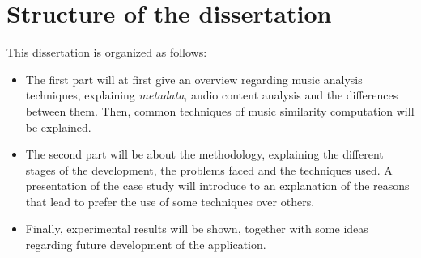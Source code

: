 \section{Structure of the dissertation}
This dissertation is organized as follows:
\begin{itemize}
\item The first part will at first give an overview regarding music analysis techniques, explaining \textit{metadata}, audio content analysis and the differences between them. Then, common techniques of music similarity computation will be explained. 
\item The second part will be about the methodology, explaining the different stages of the development, the problems faced and the techniques used. A presentation of the case study will introduce to an explanation of the reasons that lead to prefer the use of some techniques over others.
\item Finally, experimental results will be shown, together with some ideas regarding future development of the application.
\end{itemize}

